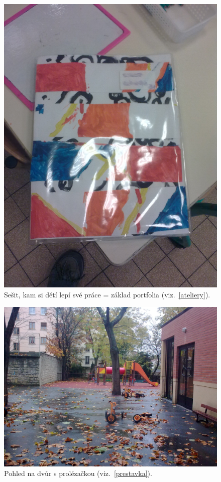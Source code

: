 	\begin{figure}[tb]
		\centering
		\includegraphics[height=0.35\textheight]{./fotky/Obr15.jpg}
		\caption{
			Sešit, kam si dětí lepí své práce = základ portfolia (viz.~\ref{ateliery}).
		}
		\label{Obr15}
	\end{figure}

	\begin{figure}[tb]
		\centering
		\includegraphics[height=0.35\textheight]{./fotky/Obr16.jpg}
		\caption{
			Pohled na dvůr s prolézačkou (viz.~\ref{prestavka}).
		}
		\label{Obr16}
	\end{figure}

